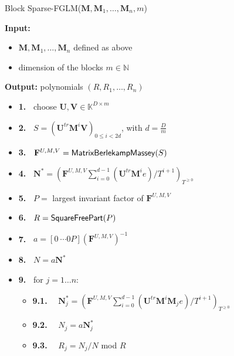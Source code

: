 \documentclass[12pt]{article}
\def\mF{\mathbf{F}}
\def\mM{\mathbf{M}}
\def\mN{\mathbf{N}}
\def\mU{\mathbf{U}}
\def\mV{\mathbf{V}}
\begin{document}
\begin{algorithm}[H]
	\caption{Block Sparse-FGLM($\mM,\mM_1,\dots,\mM_n,m$)}
	{\bf Input:} \vspace{-0.5em}
	\begin{itemize}
		\item $\mM,\mM_1,\dots,\mM_n$ defined as above
		\item dimension of the blocks $m \in \mathbb{N}$
	\end{itemize}
	{\bf Output:} polynomials $(R,R_1,\dots,R_n)$
	\begin{itemize}\setlength\itemsep{0em}
		\item[]{\bf 1.~} {\sf choose $\mU,\mV \in \mathbb{K}^{D \times m}$}
		\item[]{\bf 2.~} {\sf $S= (\mU^{tr}\mM^i\mV)_{0 \le i < 2d}$, with $d = \frac{D}{m}$}
		\item[]{\bf 3.~} {\sf $\mF^{U,M,V} = {\sf MatrixBerlekampMassey}(S)$}
		\item[]{\bf 4.~} {\sf $\mN^* = (\mF^{U,M,V}\sum_{i=0}^{d-1} {(\mU^{tr}\mM^ie)}/{T^{i+1}})_{T^{\ge 0}}$} 
		\item[]{\bf 5.~} {\sf $P=$ largest invariant factor of $\mF^{U,M,V}$}
		\item[]{\bf 6.~} {\sf $R={\sf SquareFreePart}(P)$} 
		\item[]{\bf 7.~} {\sf $a = [0 ~\cdots 0 P] (\mF^{U,M,V})^{-1}$}
		\item[]{\bf 8.~} {\sf $N=a\mN^*$}
		\item[]{\bf 9.~} {\sf for $j = 1 \dots n$:}
		\begin{itemize}
			\item[]{\bf 9.1.} ~~{\sf	$\mN_j^* = (\mF^{U,M,V}
				\sum_{i= 0}^{d-1} {(\mU^{tr}\mM^i \mM_j e)}/{T^{i+1}})_{T^{\ge0}}$}
			\item[]{\bf 9.2.} ~~{\sf $N_j=a\mN_j^*$}
			\item[]{\bf 9.3.} ~~{\sf $R_j=N_j/N$ mod $R$}
		\end{itemize}
	\end{itemize}
	\label{algo:block-sparse-fglm}
\end{algorithm}
\end{document}
